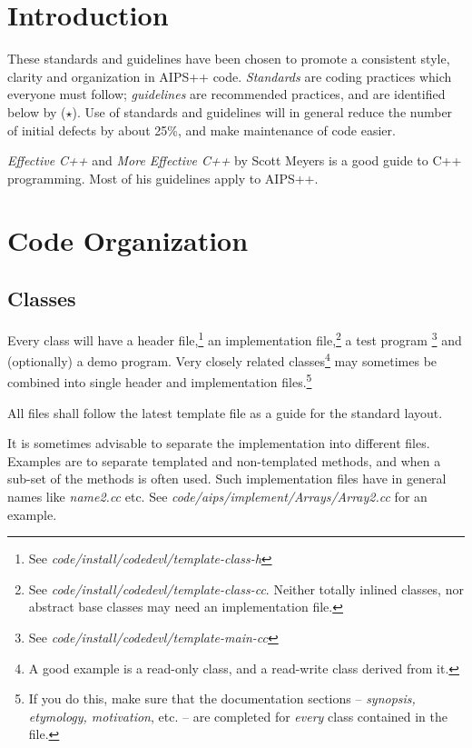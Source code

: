 \providecommand{\bmar}{\marginpar[$\parallel$]{$\parallel$}}
\section {Introduction}
These standards and guidelines have been chosen to promote a consistent
style, clarity and organization in AIPS++ code.  {\em Standards} are coding
practices which everyone must follow; {\em guidelines} are recommended
practices, and are identified below by ($\star$).
\bmar Use of standards and guidelines will in general reduce the number of
initial defects by about 25\%, and make maintenance of code easier.\bmar

{\it Effective C++} and {\it More Effective C++} \bmar 
by Scott Meyers is a good guide to C++ programming.  
Most of his guidelines apply to AIPS++. 
\section {Code Organization}
\subsection {Classes} Every class will have a header file,\footnote{See {\em
code/install/codedevl/template-class-h}} an implementation file,\footnote
{See {\em code/install/codedevl/template-class-cc}. Neither totally inlined
classes, nor abstract base classes may need an implementation file.} a test
program \footnote {See {\em code/install/codedevl/template-main-cc}} 
and (optionally) a demo program.  Very closely related classes\footnote {A
good example is a read-only class, and a read-write class derived from it.}
may sometimes be combined into single header and implementation
files.\footnote {If you do this, make sure that the documentation sections --
{\em synopsis, etymology, motivation}, etc. -- are completed for {\em every}
class contained in the file.}

\bmar All files shall follow the latest template file as a guide for the
standard layout.

It is sometimes advisable to separate the implementation into different
files. Examples are to separate templated and non-templated methods, and when
a sub-set of the methods is often used. Such implementation files have in
general names like {\it name2.cc} etc. See {\it
code/aips/implement/Arrays/Array2.cc} for an example.

